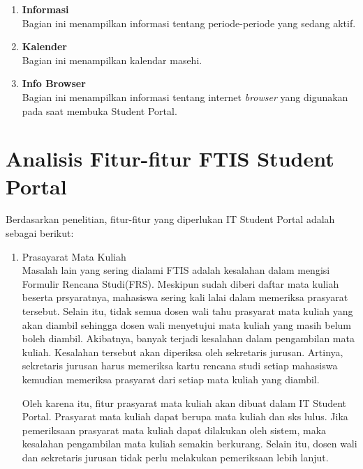 \begin{enumerate}
	\item \textbf{Informasi}\\
		Bagian ini menampilkan informasi tentang periode-periode yang sedang aktif.
	\item \textbf{Kalender}\\
		Bagian ini menampilkan kalendar masehi.
	\item \textbf{Info Browser}\\
		Bagian ini menampilkan informasi tentang internet \textit{browser} yang digunakan pada saat membuka Student Portal. 
\end{enumerate}




\section{Analisis Fitur-fitur FTIS Student Portal}
\label{sec:fitur}

Berdasarkan penelitian, fitur-fitur yang diperlukan IT Student Portal adalah sebagai berikut:

\begin{enumerate}

\item Prasayarat Mata Kuliah \\
Masalah lain yang sering dialami FTIS adalah kesalahan dalam mengisi Formulir Rencana Studi(FRS). Meskipun sudah diberi daftar mata kuliah beserta prsyaratnya, mahasiswa sering kali lalai dalam memeriksa prasyarat tersebut. Selain itu, tidak semua dosen wali tahu prasyarat mata kuliah yang akan diambil sehingga dosen wali menyetujui mata kuliah yang masih belum boleh diambil. Akibatnya, banyak terjadi kesalahan dalam pengambilan mata kuliah. Kesalahan tersebut akan diperiksa oleh sekretaris jurusan. Artinya, sekretaris jurusan harus memeriksa kartu rencana studi setiap mahasiswa kemudian memeriksa prasyarat dari setiap mata kuliah yang diambil. 

Oleh karena itu, fitur prasyarat mata kuliah akan dibuat dalam IT Student Portal.  Prasyarat mata kuliah dapat berupa mata kuliah dan sks lulus. Jika pemeriksaan prasyarat mata kuliah dapat dilakukan oleh sistem, maka kesalahan pengambilan mata kuliah semakin berkurang. Selain itu, dosen wali dan sekretaris jurusan tidak perlu melakukan pemeriksaan lebih lanjut. 

\end{enumerate}